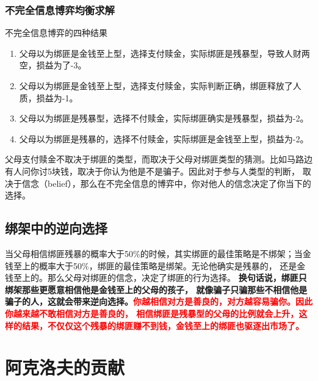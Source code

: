 \documentclass[12pt, a4paper]{article}
\begin{document}
\begin{CJK*}{UTF8}{gbsn}
        \subsubsection{不完全信息博弈均衡求解}
        不完全信息博弈的四种结果
        \begin{enumerate}
            \item 父母以为绑匪是金钱至上型，选择支付赎金，实际绑匪是残暴型，导致人财两空，损益为了-3。
            \item 父母以为绑匪是金钱至上型，选择支付赎金，实际判断正确，绑匪释放了人质，损益为-1。
            \item 父母以为绑匪是残暴型，选择不付赎金，实际绑匪确实是残暴型，损益为-2。
            \item 父母以为绑匪是残暴的，选择不付赎金，实际绑匪是金钱至上型，损益为-2。
        \end{enumerate}
        父母支付赎金不取决于绑匪的类型，而取决于父母对绑匪类型的猜测。比如马路边有人问你讨5块钱，取决于你认为他是不是骗子。因此对于参与人类型的判断，
        取决于信念（belief），那么在不完全信息的博弈中，你对他人的信念决定了你当下的选择。

        \subsection{绑架中的逆向选择}
        当父母相信绑匪残暴的概率大于50\%的时候，其实绑匪的最佳策略是不绑架；当金钱至上的概率大于50\%，绑匪的最佳策略是绑架。无论他确实是残暴的，
        还是金钱至上的。那么父母对绑匪的信念，决定了绑匪的行为选择。\textbf{ 换句话说，绑匪只绑架那些更愿意相信他是金钱至上的父母的孩子，
        就像骗子只骗那些不相信他是骗子的人，这就会带来逆向选择。\textcolor{red}{你越相信对方是善良的，对方越容易骗你。因此你越来越不敢相信对方是善良的，
       相信绑匪是残暴型的父母的比例就会上升，这样的结果，不仅仅这个残暴的绑匪赚不到钱，金钱至上的绑匪也驱逐出市场了。}}\par

       \clearpage
       \section{阿克洛夫的贡献}

\end{CJK*}
\end{document}
